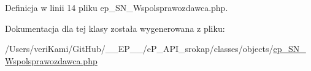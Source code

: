 Definicja w linii 14 pliku ep\-\_\-\-S\-N\-\_\-\-Wspolsprawozdawca.\-php.



Dokumentacja dla tej klasy została wygenerowana z pliku\-:\begin{DoxyCompactItemize}
\item 
/\-Users/veri\-Kami/\-Git\-Hub/\-\_\-\-\_\-\-E\-P\-\_\-\-\_\-/e\-P\-\_\-\-A\-P\-I\-\_\-srokap/classes/objects/\hyperlink{ep___s_n___wspolsprawozdawca_8php}{ep\-\_\-\-S\-N\-\_\-\-Wspolsprawozdawca.\-php}\end{DoxyCompactItemize}
